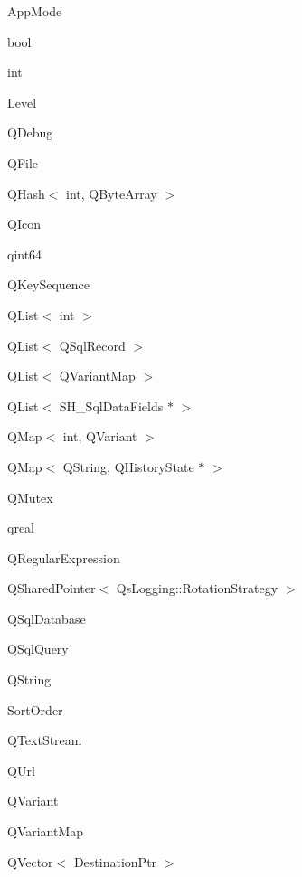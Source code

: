 \begin{DoxyCompactList}
\begin{DoxyCompactList}
\end{DoxyCompactList}
\item {}
\item {}
\item {}
\item {}
\item {}
\begin{DoxyCompactList}
\item {}
\end{DoxyCompactList}
\item {}
\begin{DoxyCompactList}
\item {}
\end{DoxyCompactList}
\item App\-Mode\item bool\item int\item Level\item Q\-Debug\item Q\-File\item Q\-Hash$<$ int, Q\-Byte\-Array $>$\item Q\-Icon\item qint64\item Q\-Key\-Sequence\item Q\-List$<$ int $>$\item Q\-List$<$ Q\-Sql\-Record $>$\item Q\-List$<$ Q\-Variant\-Map $>$\item Q\-List$<$ S\-H\-\_\-\-Sql\-Data\-Fields $\ast$ $>$\item Q\-Map$<$ int, Q\-Variant $>$\item Q\-Map$<$ Q\-String, Q\-History\-State $\ast$ $>$\item Q\-Mutex\item qreal\item Q\-Regular\-Expression\item Q\-Shared\-Pointer$<$ Qs\-Logging\-:\-:Rotation\-Strategy $>$\item Q\-Sql\-Database\item Q\-Sql\-Query\item Q\-String\item Sort\-Order\item Q\-Text\-Stream\item Q\-Url\item Q\-Variant\item Q\-Variant\-Map\item Q\-Vector$<$ Destination\-Ptr $>$\end{DoxyCompactList}
